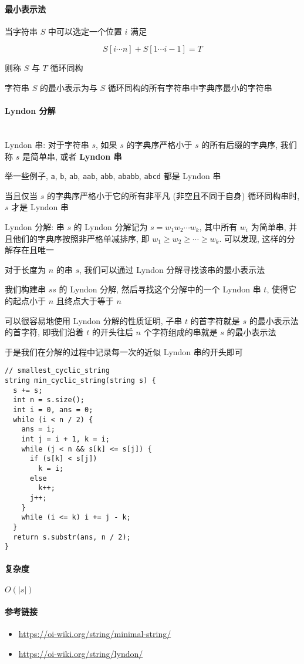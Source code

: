\paragraph{最小表示法}

当字符串 \(S\) 中可以选定一个位置 \(i\) 满足

\[
    S[i\cdots n]+S[1\cdots i-1]=T
\]

则称 \(S\) 与 \(T\) 循环同构

字符串 \(S\) 的最小表示为与 \(S\) 循环同构的所有字符串中字典序最小的字符串

\paragraph{Lyndon 分解}~\\

Lyndon 串: 对于字符串 \(s\), 如果 \(s\) 的字典序严格小于 \(s\) 的所有后缀的字典序, 我们称 \(s\) 是简单串, 或者 \textbf{Lyndon 串}

举一些例子, \verb|a|, \verb|b|, \verb|ab|, \verb|aab|, \verb|abb|, \verb|ababb|, \verb|abcd| 都是 Lyndon 串

当且仅当 \(s\) 的字典序严格小于它的所有非平凡 (非空且不同于自身) 循环同构串时, \(s\) 才是 Lyndon 串

Lyndon 分解: 串 \(s\) 的 Lyndon 分解记为 \(s=w_1w_2\cdots w_k\), 其中所有 \(w_i\) 为简单串, 并且他们的字典序按照非严格单减排序, 即 \(w_1\ge w_2\ge\cdots\ge w_k\). 可以发现, 这样的分解存在且唯一

对于长度为 \(n\) 的串 \(s\), 我们可以通过 Lyndon 分解寻找该串的最小表示法

我们构建串 \(ss\) 的 Lyndon 分解, 然后寻找这个分解中的一个 Lyndon 串 \(t\), 使得它的起点小于 \(n\) 且终点大于等于 \(n\)

可以很容易地使用 Lyndon 分解的性质证明, 子串 \(t\) 的首字符就是 \(s\) 的最小表示法的首字符, 即我们沿着 \(t\) 的开头往后 \(n\) 个字符组成的串就是 \(s\) 的最小表示法

于是我们在分解的过程中记录每一次的近似 Lyndon 串的开头即可

\begin{verbatim}
// smallest_cyclic_string
string min_cyclic_string(string s) {
  s += s;
  int n = s.size();
  int i = 0, ans = 0;
  while (i < n / 2) {
    ans = i;
    int j = i + 1, k = i;
    while (j < n && s[k] <= s[j]) {
      if (s[k] < s[j])
        k = i;
      else
        k++;
      j++;
    }
    while (i <= k) i += j - k;
  }
  return s.substr(ans, n / 2);
}
\end{verbatim}

\paragraph{复杂度}

\(O(|s|)\)

\paragraph{参考链接}

\begin{itemize}
    \item \url{https://oi-wiki.org/string/minimal-string/}
    \item \url{https://oi-wiki.org/string/lyndon/}
\end{itemize}
